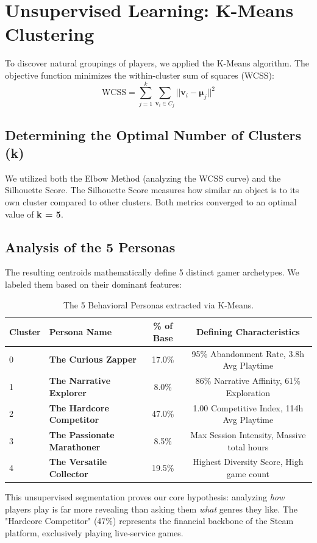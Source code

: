 \documentclass[12pt, a4paper]{report}
\begin{document}
\section{Unsupervised Learning: K-Means Clustering}
To discover natural groupings of players, we applied the K-Means algorithm. The objective function minimizes the within-cluster sum of squares (WCSS):
\[ \text{WCSS} = \sum_{j=1}^{k} \sum_{\mathbf{v}_i \in C_j} ||\mathbf{v}_i - \boldsymbol{\mu}_j||^2 \]

\subsection{Determining the Optimal Number of Clusters (k)}
We utilized both the Elbow Method (analyzing the WCSS curve) and the Silhouette Score. The Silhouette Score measures how similar an object is to its own cluster compared to other clusters. Both metrics converged to an optimal value of \textbf{k = 5}.

\subsection{Analysis of the 5 Personas}
The resulting centroids mathematically define 5 distinct gamer archetypes. We labeled them based on their dominant features:

\begin{table}[H]
\centering
\begin{tabular}{@{}llcc@{}}
\toprule
\textbf{Cluster} & \textbf{Persona Name} & \textbf{\% of Base} & \textbf{Defining Characteristics} \\ \midrule
0 & \textbf{The Curious Zapper} & 17.0\% & 95\% Abandonment Rate, 3.8h Avg Playtime \\
1 & \textbf{The Narrative Explorer} & 8.0\% & 86\% Narrative Affinity, 61\% Exploration \\
2 & \textbf{The Hardcore Competitor} & 47.0\% & 1.00 Competitive Index, 114h Avg Playtime \\
3 & \textbf{The Passionate Marathoner} & 8.5\% & Max Session Intensity, Massive total hours \\
4 & \textbf{The Versatile Collector} & 19.5\% & Highest Diversity Score, High game count \\ \bottomrule
\end{tabular}
\caption{The 5 Behavioral Personas extracted via K-Means.}
\label{tab:personas}
\end{table}

This unsupervised segmentation proves our core hypothesis: analyzing \textit{how} players play is far more revealing than asking them \textit{what} genres they like. The "Hardcore Competitor" (47\%) represents the financial backbone of the Steam platform, exclusively playing live-service games.
\end{document}
